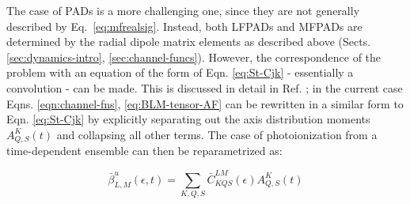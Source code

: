 \documentclass[10pt]{article}
\begin{document}

The case of PADs is a more challenging one, since they are not generally described by Eq.~\ref{eq:mfrealsig}. Instead, both LFPADs and MFPADs are determined by the radial dipole matrix elements as described above (Sects. \ref{sec:dynamics-intro}, \ref{sec:channel-funcs}). However, the correspondence of the problem with an equation of the form of Eqn. \ref{eq:St-Cjk} - essentially a convolution - can be made. This is discussed in detail in Ref. \cite{Underwood2000}; in the current case Eqns. \ref{eqn:channel-fns}, \ref{eq:BLM-tensor-AF} can be rewritten in a similar form to Eqn. \ref{eq:St-Cjk} by explicitly separating out the axis distribution moments $A_{Q,S}^{K}(t)$ and collapsing all other terms. The case of photoionization from a time-dependent ensemble can then be reparametrized as:




\begin{equation}
\bar{\beta}_{L,M}^{u}(\epsilon,t)=\sum_{K,Q,S}\bar{C}_{KQS}^{LM}(\epsilon)A_{Q,S}^{K}(t)
\label{eqn:beta-convolution-C}
\end{equation}
\end{document}
